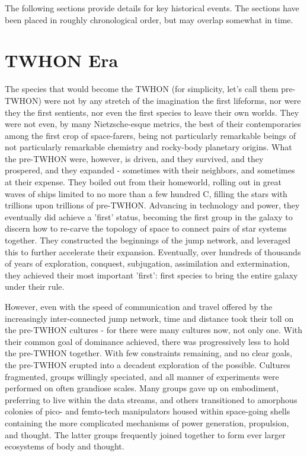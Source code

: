 The following sections provide details for key historical events. The
sections have been placed in roughly chronological order, but may
overlap somewhat in time.

\section{TWHON Era}
The species that would become the TWHON (for simplicity, let's call 
them pre-TWHON) were not by any stretch of the imagination the first 
lifeforms, nor were they the first sentients, nor even the first 
species to leave their own worlds. They were not even, by many 
Nietzsche-esque metrics, the best of their contemporaries among the first 
crop of space-farers, being not particularly remarkable beings of not 
particularly remarkable chemistry and rocky-body planetary 
origins. What the pre-TWHON were, however, is driven, and they 
survived, and they prospered, and they expanded - sometimes with their 
neighbors, and sometimes at their expense. They boiled out from their 
homeworld, rolling out in great waves of ships limited to no more than 
a few hundred C, filling the stars with trillions upon trillions of 
pre-TWHON. Advancing in technology and power, they eventually did 
achieve a 'first' status, becoming the first group in the galaxy to 
discern how to re-carve the topology of space to connect pairs of star 
systems together. They constructed the beginnings of the jump network, 
and leveraged this to further accelerate their expansion. Eventually, 
over hundreds of thousands of years of exploration, conquest, 
subjugation, assimilation and extermination, they achieved their most 
important 'first': first species to bring the entire galaxy under 
their rule. 

However, even with the speed of communication and travel offered by 
the increasingly inter-connected jump network, time and distance took 
their toll on the pre-TWHON cultures - for there were many cultures 
now, not only one. With their common goal of dominance achieved, there 
was progressively less to hold the pre-TWHON together. With few 
constraints remaining, and no clear goals, the pre-TWHON erupted into 
a decadent exploration of the possible. Cultures fragmented, groups 
willingly speciated, and all manner of experiments were performed on 
often grandiose scales. Many groups gave up on embodiment, preferring 
to live within the data streams, and others transitioned to amorphous 
colonies of pico- and femto-tech manipulators housed within 
space-going shells containing the more complicated mechanisms of power 
generation, propulsion, and thought. The latter groups frequently 
joined together to form ever larger ecosystems of body and thought. 

